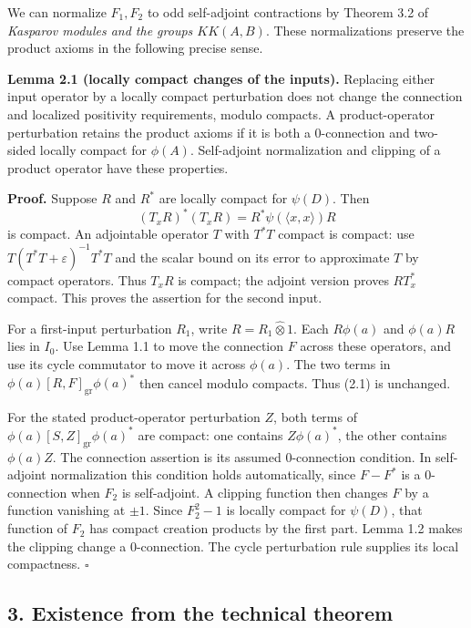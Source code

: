 \documentclass[
  11pt,
]{article}
\begin{document}
We can normalize \(F_1,F_2\) to odd self-adjoint contractions by Theorem
3.2 of \emph{Kasparov modules and the groups \(KK(A,B)\)}. These
normalizations preserve the product axioms in the following precise
sense.

\textbf{Lemma 2.1 (locally compact changes of the inputs).} Replacing
either input operator by a locally compact perturbation does not change
the connection and localized positivity requirements, modulo compacts. A
product-operator perturbation retains the product axioms if it is both a
\(0\)-connection and two-sided locally compact for \(\phi(A)\).
Self-adjoint normalization and clipping of a product operator have these
properties.

\textbf{Proof.} Suppose \(R\) and \(R^*\) are locally compact for
\(\psi(D)\). Then \[
(T_xR)^*(T_xR)=R^*\psi(\langle x,x\rangle)R
\] is compact. An adjointable operator \(T\) with \(T^*T\) compact is
compact: use \(T(T^*T+\varepsilon)^{-1}T^*T\) and the scalar bound on
its error to approximate \(T\) by compact operators. Thus \(T_xR\) is
compact; the adjoint version proves \(RT_x^*\) compact. This proves the
assertion for the second input.

For a first-input perturbation \(R_1\), write \(R=R_1\widehat\otimes1\).
Each \(R\phi(a)\) and \(\phi(a)R\) lies in \(I_0\). Use Lemma 1.1 to
move the connection \(F\) across these operators, and use its cycle
commutator to move it across \(\phi(a)\). The two terms in
\(\phi(a)[R,F]_{\mathrm{gr}}\phi(a)^*\) then cancel modulo compacts.
Thus (2.1) is unchanged.

For the stated product-operator perturbation \(Z\), both terms of
\(\phi(a)[S,Z]_{\mathrm{gr}}\phi(a)^*\) are compact: one contains
\(Z\phi(a)^*\), the other contains \(\phi(a)Z\). The connection
assertion is its assumed \(0\)-connection condition. In self-adjoint
normalization this condition holds automatically, since \(F-F^*\) is a
\(0\)-connection when \(F_2\) is self-adjoint. A clipping function then
changes \(F\) by a function vanishing at \(\pm1\). Since \(F_2^2-1\) is
locally compact for \(\psi(D)\), that function of \(F_2\) has compact
creation products by the first part. Lemma 1.2 makes the clipping change
a \(0\)-connection. The cycle perturbation rule supplies its local
compactness. \(\square\)

\subsection{3. Existence from the technical
theorem}\label{existence-from-the-technical-theorem}
\end{document}
